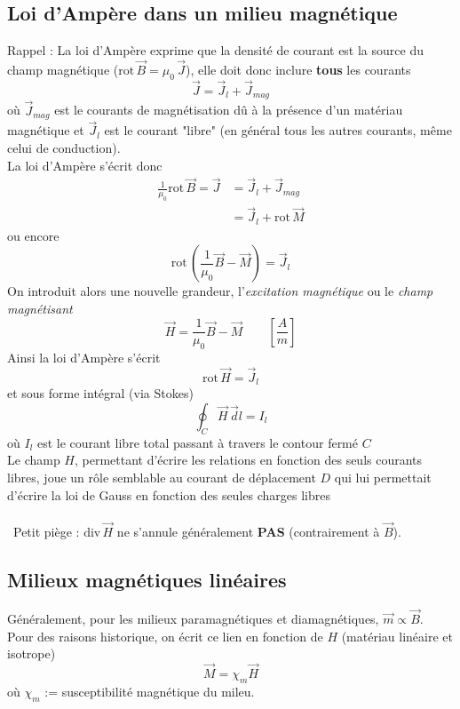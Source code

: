\documentclass	[11pt, a4paper, openany]{book}
\newcommand{\rot}{\text{rot}\,}
\newcommand{\divv}{\text{div}\,}
\newcommand{\danger}{{\huge\fontencoding{U}\fontfamily{futs}\selectfont\char 66\relax}\ }
\begin{document}
\subsection{Loi d'Ampère dans un milieu magnétique}
Rappel : La loi d'Ampère exprime que la densité de courant est la source du champ magnétique ($\rot\vec B=\mu_0\,\vec J$), elle doit donc inclure \textbf{tous} les courants
\begin{equation}
\vec J=\vec J_{l}+\vec J_{mag}
\end{equation}
où $\vec J_{mag}$ est le courants de magnétisation dû à la présence d'un matériau magnétique et $\vec J_{l}$ est le courant "libre" (en général tous les autres courants, même celui de conduction).\\

La loi d'Ampère s'écrit donc 
\begin{align}
\frac{1}{\mu_0}\rot\vec B=\vec J & =\vec J_{l}+\vec J_{mag}\\
 & =\vec J_{l}+\rot\vec M
\end{align}
ou encore 
\begin{equation}
\rot\left(\frac{1}{\mu_0}\vec B-\vec M\right)=\vec J_{l}
\end{equation}
On introduit alors une nouvelle grandeur, l'\textit{excitation magnétique} ou le \textit{champ magnétisant}
\begin{equation}\label{eq:defH}
\vec H=\frac{1}{\mu_0}\vec B-\vec M\qquad \left[\frac{A}{m}\right]
\end{equation}
Ainsi la loi d'Ampère s'écrit
\begin{equation}
\rot\vec H=\vec J_{l}
\end{equation}
et sous forme intégral (via Stokes)
\begin{equation}\label{eq:ampereH}
\oint_C\vec H\,\vec dl=I_{l}
\end{equation}
où $I_{l}$ est le courant libre total passant à travers le contour fermé $C$\\

Le champ $H$, permettant d'écrire les relations en fonction des seuls courants libres, joue un rôle semblable au courant de déplacement $D$ qui lui permettait d'écrire la loi de Gauss en fonction des seules charges libres\\\\
\danger Petit piège :  $\divv \vec{H}$ ne s'annule généralement \textbf{PAS} (contrairement à $\vec{B}$).
\subsection{Milieux magnétiques linéaires}
Généralement, pour les milieux paramagnétiques et diamagnétiques,  $\vec m \propto\vec B$.\ \\
Pour des raisons historique, on écrit ce lien en fonction de $H$ (matériau linéaire et isotrope)
\begin{equation}
\vec M=\chi_m\vec H
\end{equation}
où $\chi_m$ := susceptibilité magnétique du mileu.\\
\end{document}
